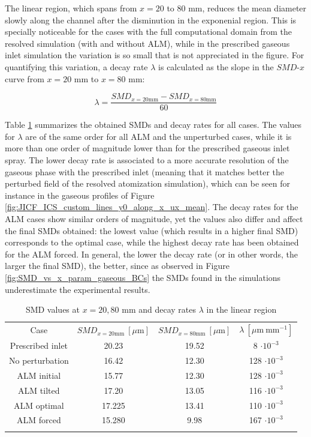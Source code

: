 The linear region, which spans from $x = 20$ to $80$ mm, reduces the mean diameter slowly along the channel after the disminution in the exponenial region. This is specially noticeable for the cases with the full computational domain from the resolved simulation (with and without ALM), while in the prescribed gaseous inlet simulation the variation is so small that is not appreciated in the figure. For quantifying this variation, a decay rate $\lambda$ is calculated as the slope in the $SMD$-$x$ curve from $x =20$ mm to $x = 80$ mm:

\begin{equation}
\lambda = \frac{SMD_{x=20\mathrm{mm}} -  SMD_{x=80\mathrm{mm}}}{60}
\end{equation} 

Table \ref{tab:SMD_decay_rates} summarizes the obtained SMDs and decay rates for all cases. The values for $\lambda$ are of the same order for all ALM and the unperturbed cases, while it is more than one order of magnitude lower than for the prescribed gaseous inlet spray. The lower decay rate is associated to a more accurate resolution of the gaseous phase with the prescribed inlet (meaning that it matches better the perturbed field of the resolved atomization simulation), which can be seen for instance in the gaseous profiles of Figure \ref{fig:JICF_ICS_custom_lines_y0_along_x_ux_mean}. The decay rates for the ALM cases show similar orders of magnitude, yet the values also differ and affect the final SMDs obtained: the lowest value (which results in a higher final SMD) corresponds to the optimal case, while the highest decay rate has been obtained for the ALM forced. In general, the lower the decay rate (or in other words, the larger the final SMD), the better, since as observed in Figure \ref{fig:SMD_vs_x_param_gaseous_BCs} the SMDs found in the simulations underestimate the experimental results.


\begin{table}[!h]
\centering
\caption{SMD values at $x = 20, 80$ mm and decay rates $\lambda$ in the linear region}
\begin{tabular}{cccc}
\thickhline
Case & $SMD_{x=20\mathrm{mm}}~\left[\mu \mathrm{m} \right]$ & $SMD_{x=80\mathrm{mm}}~\left[\mu \mathrm{m} \right]$ & $\lambda~\left[\mu \mathrm{m} ~ \mathrm{mm}^{-1} \right]$ \\
\thickhline
Prescribed inlet & 20.23 & 19.52 & 8 $\cdot 10^{-3}$ \\
No perturbation & 16.42 & 12.30 & 128 $\cdot 10^{-3}$\\
ALM initial & 15.77 & 12.30 & 128 $\cdot 10^{-3}$ \\
ALM tilted & 17.20 & 13.05 & 116 $\cdot 10^{-3}$ \\
ALM optimal & 17.225 & 13.41 & 110 $\cdot 10^{-3}$ \\
ALM forced & 15.280 & 9.98 & 167 $\cdot 10^{-3}$ \\
\thickhline
\end{tabular}
\label{tab:SMD_decay_rates}
\end{table}






